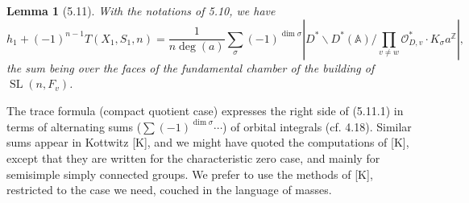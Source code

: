 \documentclass[10pt]{article}
\newcommand{\Z}{\mathbb Z}
\newcommand{\Adele}{\mathbb A}
\newcommand{\SL}{\operatorname{SL}}
\newcommand{\degm}{\operatorname{deg}}
\theoremstyle{deligne}
\newtheorem*{lemma*}{Lemma}
\begin{document}
\begin{lemma*}[5.11]
With the notations of 5.10, we have
\begin{equation}\tag{5.11.1}
h_1+(-1)^{n-1}T(X_1,S_1,n)
=\frac{1}{n\degm(a)}\sum_\sigma(-1)^{\dim\sigma}
\left|D^*\backslash D^*(\Adele)/\prod_{v\ne w}\mathcal O_{D,v}^*\cdot K_\sigma a^\Z\right|,
\end{equation}
the sum being over the faces of the fundamental chamber of the building of $\SL(n,F_v)$.
\end{lemma*}

The trace formula (compact quotient case) expresses the right side of (5.11.1) in terms of alternating sums ($\sum(-1)^{\dim\sigma}\cdots$) of orbital integrals (cf. 4.18). Similar sums appear in Kottwitz [K], and we might have quoted the computations of [K], except that they are written for the characteristic zero case, and mainly for semisimple simply connected groups. We prefer to use the methods of [K], restricted to the case we need, couched in the language of masses.
\end{document}
